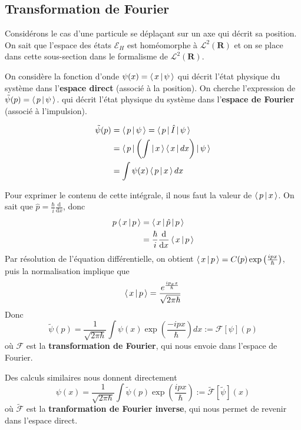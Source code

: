     \subsection{Transformation de Fourier}

        Considérons le cas d’une particule se déplaçant sur un axe qui décrit sa position. On sait que l’espace des états $\mathcal{E}_H$ est homéomorphe à $\mathcal{L}^2(\mathbf{R})$ et on se place dans cette sous-section dans le formalisme de $\mathcal{L}^2(\mathbf{R})$. 
        
        On considère la fonction d’onde $\psi(x) = \left< \, x \, \middle| \, \psi \, \right>$ qui décrit l’état physique du système dans l’\textbf{espace direct} (associé à la position). On cherche l’expression de $\tilde{\psi}(p) = \left< \, p \, \middle| \, \psi \, \right>$. qui décrit l’état physique du système dans l’\textbf{espace de Fourier} (associé à l’impulsion). 

        \begin{align*}
            \tilde{\psi}(p) &= \left< \, p \, \middle| \, \psi \, \right> = \left< \, p \, \right| \hat{I} \left| \, \psi \, \right> \\
            &= \left< \, p \, \right| \left(\int \left| \, x \, \right> \left< \, x \, \right| dx\right) \left| \, \psi \, \right> \\
            &= \int \psi(x) \left< \, p \, \middle| \, x \, \right> dx \\
        \end{align*}
        
        Pour exprimer le contenu de cette intégrale, il nous faut la valeur de $\left< \, p \, \middle| \, x \, \right>$. On sait que $\hat{p} = \frac{\hbar}{i} \frac{\text{d}}{\text{d}x}$, donc 
        \begin{align*}
            p\left< \, x \, \middle| \, p \, \right> 
            &= \left< \, x \, \right| \hat{p} \left| \, p \, \right> \\
            &= \frac{\hbar}{i} \frac{\text{d}}{\text{d}x} \left< \, x \, \middle| \, p \, \right> \\ 
        \end{align*}
        Par résolution de l’équation différentielle, on obtient $\left< \, x \, \middle| \, p \, \right> = C(p) \exp\left(\frac{ipx}{\hbar}\right)$, puis la normalisation implique que 
        \[ \left< \, x \, \middle| \, p \, \right> = \frac{e^{\frac{i p_x x}{\hbar}}}{\sqrt{2\pi \hbar}} \]
        Donc 
        \[ \tilde{\psi}(p) = \frac{1}{\sqrt{2 \pi \hbar}} \int \psi(x) \exp\left(\frac{- i p x}{\hbar}\right) dx := \mathcal{F}[\psi](p) \]
        où $\mathcal{F}$ est la \textbf{transformation de Fourier}, qui nous envoie dans l’espace de Fourier.

        Des calculs similaires nous donnent directement 
        \[ \psi(x) = \frac{1}{\sqrt{2 \pi \hbar}} \int \tilde{\psi}(p) \exp\left(\frac{i p x}{\hbar}\right) := \tilde{\mathcal{F}}[\tilde{\psi}](x) \]   
        où $\tilde{\mathcal{F}}$ est la \textbf{tranformation de Fourier inverse}, qui nous permet de revenir dans l’espace direct.

